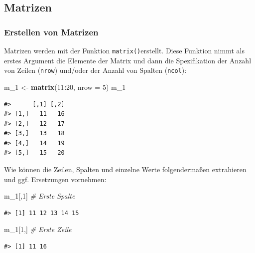 \documentclass[]{book}
\newenvironment{Shaded}{\begin{snugshade}}{\end{snugshade}}
\newcommand{\KeywordTok}[1]{\textcolor[rgb]{0.13,0.29,0.53}{\textbf{#1}}}
\newcommand{\DataTypeTok}[1]{\textcolor[rgb]{0.13,0.29,0.53}{#1}}
\newcommand{\DecValTok}[1]{\textcolor[rgb]{0.00,0.00,0.81}{#1}}
\newcommand{\StringTok}[1]{\textcolor[rgb]{0.31,0.60,0.02}{#1}}
\newcommand{\CommentTok}[1]{\textcolor[rgb]{0.56,0.35,0.01}{\textit{#1}}}
\newcommand{\OperatorTok}[1]{\textcolor[rgb]{0.81,0.36,0.00}{\textbf{#1}}}
\newcommand{\NormalTok}[1]{#1}
\begin{document}
\subsection{Matrizen}\label{matrizen}

\subsubsection{Erstellen von Matrizen}\label{erstellen-von-matrizen}

Matrizen werden mit der Funktion \texttt{matrix()}erstellt. Diese
Funktion nimmt als erstes Argument die Elemente der Matrix und dann die
Spezifikation der Anzahl von Zeilen (\texttt{nrow}) und/oder der Anzahl
von Spalten (\texttt{ncol}):

\begin{Shaded}
\begin{Highlighting}[]
\NormalTok{m_}\DecValTok{1}\NormalTok{ <-}\StringTok{ }\KeywordTok{matrix}\NormalTok{(}\DecValTok{11}\OperatorTok{:}\DecValTok{20}\NormalTok{, }\DataTypeTok{nrow =} \DecValTok{5}\NormalTok{)}
\NormalTok{m_}\DecValTok{1}
\end{Highlighting}
\end{Shaded}

\begin{verbatim}
#>      [,1] [,2]
#> [1,]   11   16
#> [2,]   12   17
#> [3,]   13   18
#> [4,]   14   19
#> [5,]   15   20
\end{verbatim}

Wie können die Zeilen, Spalten und einzelne Werte folgendermaßen
extrahieren und ggf. Ersetzungen vornehmen:

\begin{Shaded}
\begin{Highlighting}[]
\NormalTok{m_}\DecValTok{1}\NormalTok{[,}\DecValTok{1}\NormalTok{] }\CommentTok{# Erste Spalte}
\end{Highlighting}
\end{Shaded}

\begin{verbatim}
#> [1] 11 12 13 14 15
\end{verbatim}

\begin{Shaded}
\begin{Highlighting}[]
\NormalTok{m_}\DecValTok{1}\NormalTok{[}\DecValTok{1}\NormalTok{,] }\CommentTok{# Erste Zeile}
\end{Highlighting}
\end{Shaded}

\begin{verbatim}
#> [1] 11 16
\end{verbatim}
\end{document}
